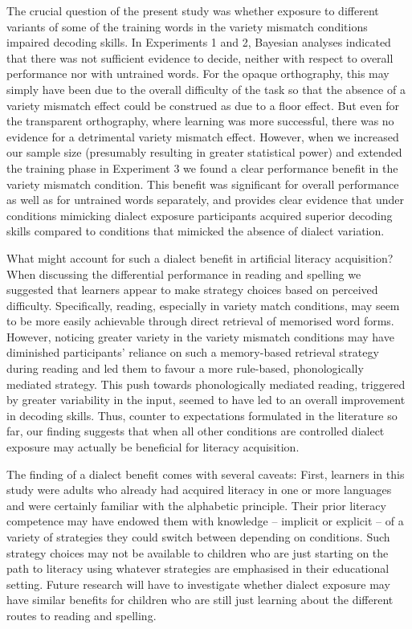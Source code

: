 \documentclass[doc,floatsintext]{apa6}
\begin{document}
The crucial question of the present study was whether exposure to
different variants of some of the training words in the variety mismatch
conditions impaired decoding skills. In Experiments 1 and 2, Bayesian
analyses indicated that there was not sufficient evidence to decide,
neither with respect to overall performance nor with untrained words.
For the opaque orthography, this may simply have been due to the overall
difficulty of the task so that the absence of a variety mismatch effect
could be construed as due to a floor effect. But even for the
transparent orthography, where learning was more successful, there was
no evidence for a detrimental variety mismatch effect. However, when we
increased our sample size (presumably resulting in greater statistical
power) and extended the training phase in Experiment 3 we found a clear
performance benefit in the variety mismatch condition. This benefit was
significant for overall performance as well as for untrained words
separately, and provides clear evidence that under conditions mimicking
dialect exposure participants acquired superior decoding skills compared
to conditions that mimicked the absence of dialect variation.

What might account for such a dialect benefit in artificial literacy
acquisition? When discussing the differential performance in reading and
spelling we suggested that learners appear to make strategy choices
based on perceived difficulty. Specifically, reading, especially in
variety match conditions, may seem to be more easily achievable through
direct retrieval of memorised word forms. However, noticing greater
variety in the variety mismatch conditions may have diminished
participants' reliance on such a memory-based retrieval strategy during
reading and led them to favour a more rule-based, phonologically
mediated strategy. This push towards phonologically mediated reading,
triggered by greater variability in the input, seemed to have led to an
overall improvement in decoding skills. Thus, counter to expectations
formulated in the literature so far, our finding suggests that when all
other conditions are controlled dialect exposure may actually be
beneficial for literacy acquisition.

The finding of a dialect benefit comes with several caveats: First,
learners in this study were adults who already had acquired literacy in
one or more languages and were certainly familiar with the alphabetic
principle. Their prior literacy competence may have endowed them with
knowledge -- implicit or explicit -- of a variety of strategies they
could switch between depending on conditions. Such strategy choices may
not be available to children who are just starting on the path to
literacy using whatever strategies are emphasised in their educational
setting. Future research will have to investigate whether dialect
exposure may have similar benefits for children who are still just
learning about the different routes to reading and spelling.
\end{document}
